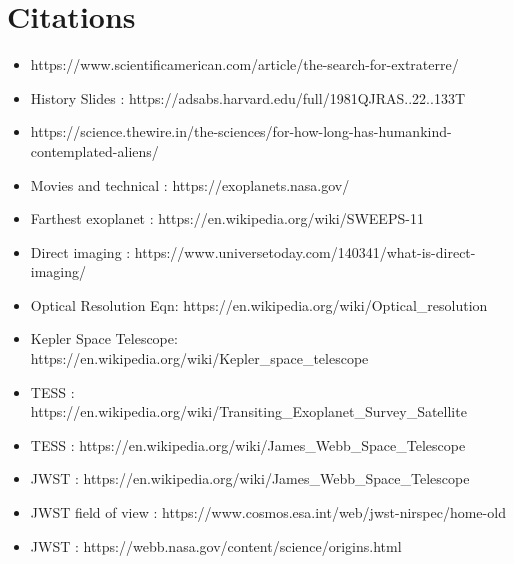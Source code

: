 \documentclass{beamer}
\begin{document}
\section{Citations}
\begin{frame}
\begin{itemize}
    \item \scriptsize{https://www.scientificamerican.com/article/the-search-for-extraterre/}
    \item History Slides : \scriptsize{https://adsabs.harvard.edu/full/1981QJRAS..22..133T}
    \item \scriptsize{https://science.thewire.in/the-sciences/for-how-long-has-humankind-contemplated-aliens/}
    \item Movies and technical : \scriptsize{https://exoplanets.nasa.gov/}
    \item Farthest exoplanet : \scriptsize{https://en.wikipedia.org/wiki/SWEEPS-11}
    \item Direct imaging : \scriptsize{https://www.universetoday.com/140341/what-is-direct-imaging/}
    \item Optical Resolution Eqn: \scriptsize{https://en.wikipedia.org/wiki/Optical\_resolution}
    \item Kepler Space Telescope: \scriptsize{https://en.wikipedia.org/wiki/Kepler\_space\_telescope}
    \item TESS : \scriptsize{https://en.wikipedia.org/wiki/Transiting\_Exoplanet\_Survey\_Satellite}
    \item TESS : \scriptsize{https://en.wikipedia.org/wiki/James\_Webb\_Space\_Telescope}
    \item JWST : \scriptsize{https://en.wikipedia.org/wiki/James\_Webb\_Space\_Telescope}
    \item JWST field of view : \scriptsize{https://www.cosmos.esa.int/web/jwst-nirspec/home-old}
    \item JWST : \scriptsize{https://webb.nasa.gov/content/science/origins.html}
\end{itemize}
\end{frame}
\end{document}
